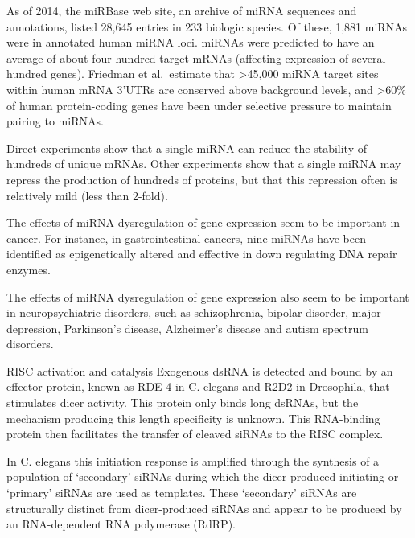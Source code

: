 As of 2014, the miRBase web site, an archive of miRNA sequences and annotations, listed 28,645 entries in 233 biologic species. Of these, 1,881 miRNAs were in annotated human miRNA loci. miRNAs were predicted to have an average of about four hundred target mRNAs (affecting expression of several hundred genes). Friedman et al.~estimate that \textgreater{}45,000 miRNA target sites within human mRNA 3'UTRs are conserved above background levels, and \textgreater{}60\% of human protein-coding genes have been under selective pressure to maintain pairing to miRNAs.

Direct experiments show that a single miRNA can reduce the stability of hundreds of unique mRNAs. Other experiments show that a single miRNA may repress the production of hundreds of proteins, but that this repression often is relatively mild (less than 2-fold).

The effects of miRNA dysregulation of gene expression seem to be important in cancer. For instance, in gastrointestinal cancers, nine miRNAs have been identified as epigenetically altered and effective in down regulating DNA repair enzymes.

The effects of miRNA dysregulation of gene expression also seem to be important in neuropsychiatric disorders, such as schizophrenia, bipolar disorder, major depression, Parkinson's disease, Alzheimer's disease and autism spectrum disorders.

RISC activation and catalysis
Exogenous dsRNA is detected and bound by an effector protein, known as RDE-4 in C. elegans and R2D2 in Drosophila, that stimulates dicer activity. This protein only binds long dsRNAs, but the mechanism producing this length specificity is unknown. This RNA-binding protein then facilitates the transfer of cleaved siRNAs to the RISC complex.

In C. elegans this initiation response is amplified through the synthesis of a population of `secondary' siRNAs during which the dicer-produced initiating or `primary' siRNAs are used as templates. These `secondary' siRNAs are structurally distinct from dicer-produced siRNAs and appear to be produced by an RNA-dependent RNA polymerase (RdRP).

